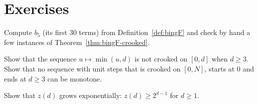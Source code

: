 
\section*{Exercises}

\begin{exercise}
Compute $b_5$ (its first $30$ terms) from Definition~\ref{def:bingF} and check by hand a few
instances of Theorem~\ref{thm:bingF-crooked}.
\end{exercise}

\begin{exercise}
Show that the sequence $u\mapsto\min(u,d)$ is not crooked on $[0,d]$ when $d\ge3$. Show that no
sequence with unit steps that is crooked on $[0,N]$, starts at $0$ and ends at $d\ge3$ can be
monotone.
\end{exercise}

\begin{exercise}
Show that $z(d)$ grows exponentially: $z(d)\ge2^{d-1}$ for $d\ge1$.
\end{exercise}
